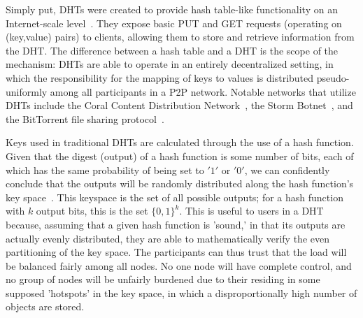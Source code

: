 \documentclass[12pt]{IEEEtran}
\begin{document}
\par Simply put, DHTs were created to provide hash table-like functionality on an Internet-scale level~\cite{Ratnasamy:2001wn}. They expose basic PUT and GET requests (operating on (key,value) pairs) to clients, allowing them to store and retrieve information from the DHT. The difference between a hash table and a DHT is the scope of the mechanism: DHTs are able to operate in an entirely decentralized setting, in which the responsibility for the mapping of keys to values is distributed pseudo-uniformly among all participants in a P2P network. Notable networks that utilize DHTs include the Coral Content Distribution Network~\cite{Freedman:2004vb}, the Storm Botnet~\cite{Holz:2008uk}, and the BitTorrent file sharing protocol~\cite{Cohen:y1_8mBnw}.

\par Keys used in traditional DHTs are calculated through the use of a hash function. Given that the digest (output) of a hash function is some number of bits, each of which has the same probability of being set to $'1'$ or $'0'$, we can confidently conclude that the outputs will be randomly distributed along the hash function's key space~. This keyspace is the set of all possible outputs; for a hash function with $k$ output bits, this is the set $\{0,1\}^k$. This is useful to users in a DHT because, assuming that a given hash function is 'sound,' in that its outputs are actually evenly distributed, they are able to mathematically verify the even partitioning of the key space. The participants can thus trust that the load will be balanced fairly among all nodes. No one node will have complete control, and no group of nodes will be unfairly burdened due to their residing in some supposed 'hotspots' in the key space, in which a disproportionally high number of objects are stored.~
\end{document}
